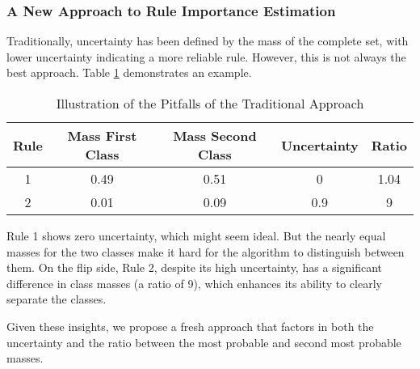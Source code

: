 \documentclass[10pt,a4paper,oneside]{article}
\begin{document}
\subsubsection{A New Approach to Rule Importance Estimation}
Traditionally, uncertainty has been defined by the mass of the complete set, with lower uncertainty indicating a more reliable rule. However, this is not always the best approach. Table \ref{table-pitfalls} demonstrates an example. 

\begin{table}[ht]
    \centering
    \caption{Illustration of the Pitfalls of the Traditional Approach}
    \label{table-pitfalls}
    \begin{tabular}{c|c|c|c|c}
        \toprule
        \textbf{Rule} & \textbf{Mass First Class} & \textbf{Mass Second Class} & \textbf{Uncertainty} & \textbf{Ratio} \\
        \midrule
        1 & 0.49 & 0.51 & 0 & 1.04 \\
        2 & 0.01 & 0.09 & 0.9 & 9 \\
        \bottomrule
    \end{tabular}

\end{table}
Rule 1 shows zero uncertainty, which might seem ideal. But the nearly equal masses for the two classes make it hard for the algorithm to distinguish between them. On the flip side, Rule 2, despite its high uncertainty, has a significant difference in class masses (a ratio of 9), which enhances its ability to clearly separate the classes.

Given these insights, we propose a fresh approach that factors in both the uncertainty and the ratio between the most probable and second most probable masses.
\end{document}
